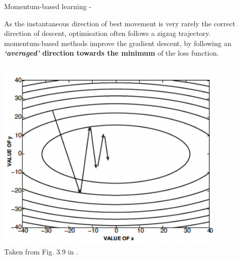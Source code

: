 
\begin{frame}[t,allowframebreaks]{
    Momentum-based learning -}

    As the instantaneous direction of best movement is very rarely 
    the correct direction of descent, 
    \gls{optimisation} 
    often follows a zigzag trajectory.\\
    \vspace{0.2cm}
    \Gls{momentum}-based methods \cite{Polyak:1964a}
    improve the  
    \gls{gradient descent}, 
    by following an 
    {\bf {\em `averaged'} direction towards the minimum} 
    of the \gls{loss function}.\\
    \begin{columns}
        \begin{column}{0.50\textwidth}
            \begin{center}
                \includegraphics[width=0.98\textwidth]
                    {./images/training_issues/aggarwal18_shape_loss_function_grad_descent_R.png}\\
                {\tiny 
                    \color{col:attribution} 
                    Taken from Fig. 3.9 in \cite{Aggarwal:2018SpringerDL}.\\    
                }
            \end{center}                
        \end{column}
        \begin{column}{0.50\textwidth}
            \begin{itemize}

\end{itemize}
\end{column}
\end{columns}
\end{frame}

